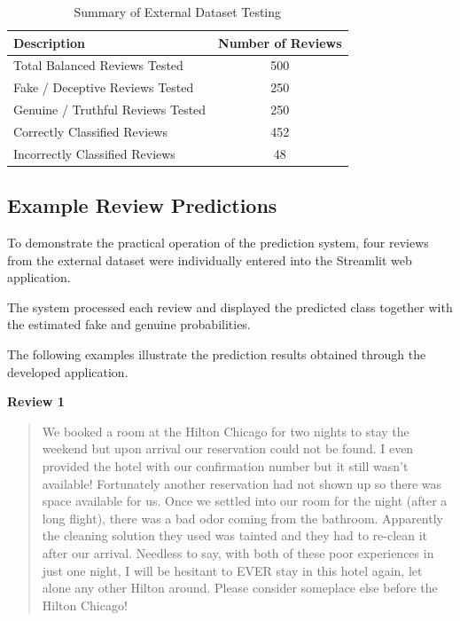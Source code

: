 \documentclass[12pt,a4paper]{report}
\begin{document}
\begin{table}[H]
\centering
\caption{Summary of External Dataset Testing}
\label{tab:external_testing_summary}

\begin{tabular}{|l|c|}
\hline
\textbf{Description} & \textbf{Number of Reviews} \\ \hline
Total Balanced Reviews Tested & 500 \\ \hline
Fake / Deceptive Reviews Tested & 250 \\ \hline
Genuine / Truthful Reviews Tested & 250 \\ \hline
Correctly Classified Reviews & 452 \\ \hline
Incorrectly Classified Reviews & 48 \\ \hline
\end{tabular}
\end{table}

\subsection{Example Review Predictions}

To demonstrate the practical operation of the
prediction system, four reviews from the external
dataset were individually entered into the
Streamlit web application.

The system processed each review and displayed
the predicted class together with the estimated
fake and genuine probabilities.

The following examples illustrate the prediction
results obtained through the developed application.

\vspace{0.3cm}
\noindent\textbf{Review 1}

\begin{quote}
We booked a room at the Hilton Chicago for two nights to stay the
weekend but upon arrival our reservation could not be found. I even
provided the hotel with our confirmation number but it still wasn't
available! Fortunately another reservation had not shown up so there
was space available for us. Once we settled into our room for the
night (after a long flight), there was a bad odor coming from the
bathroom. Apparently the cleaning solution they used was tainted and
they had to re-clean it after our arrival. Needless to say, with both
of these poor experiences in just one night, I will be hesitant to
EVER stay in this hotel again, let alone any other Hilton around.
Please consider someplace else before the Hilton Chicago!
\end{quote}
\end{document}
